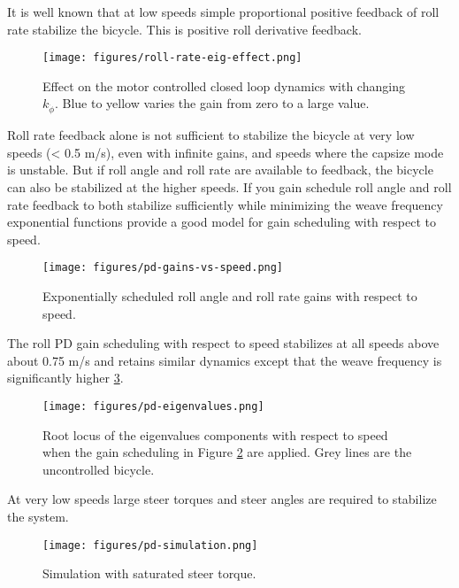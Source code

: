 \documentclass[12pt]{article}
\begin{document}
It is well known that at low speeds simple proportional positive feedback of
roll rate stabilize the bicycle. This is positive roll derivative feedback.

\begin{figure}
  \centering
  \texttt{[image: figures/roll-rate-eig-effect.png]}
  \caption{Effect on the motor controlled closed loop dynamics with changing
  \(k_{\dot{\phi}}\). Blue to yellow varies the gain from zero to a large
  value.}
  \label{fig:roll-rate-eig-effect}
\end{figure}

Roll rate feedback alone is not sufficient to stabilize the bicycle at very low
speeds (< 0.5 m/s), even with infinite gains, and speeds where the capsize mode
is unstable. But if roll angle and roll rate are available to feedback, the
bicycle can also be stabilized at the higher speeds. If you gain schedule roll
angle and roll rate feedback to both stabilize sufficiently while minimizing
the weave frequency exponential functions provide a good model for gain
scheduling with respect to speed.

\begin{figure}
  \centering
  \texttt{[image: figures/pd-gains-vs-speed.png]}
  \caption{Exponentially scheduled roll angle and roll rate gains with respect
  to speed.}
  \label{fig:pd-gains-vs-speed}
\end{figure}

The roll PD gain scheduling with respect to speed stabilizes at all speeds
above about 0.75 m/s and retains similar dynamics except that the weave
frequency is significantly higher \ref{fig:pd-eigenvalues}.

\begin{figure}
  \centering
  \texttt{[image: figures/pd-eigenvalues.png]}
  \caption{Root locus of the eigenvalues components with respect to speed when
  the gain scheduling in Figure \ref{fig:pd-gains-vs-speed} are applied. Grey
  lines are the uncontrolled bicycle.}
  \label{fig:pd-eigenvalues}
\end{figure}

At very low speeds large steer torques and steer angles are required to
stabilize the system.

\begin{figure}
  \centering
  \texttt{[image: figures/pd-simulation.png]}
  \caption{Simulation with saturated steer torque.}
  \label{fig:pd_simulation}
\end{figure}
\end{document}
